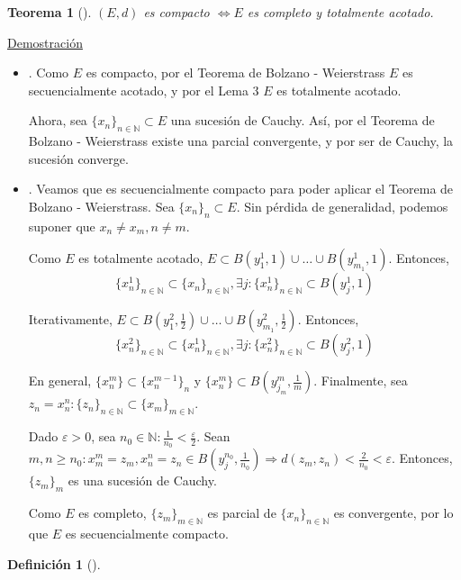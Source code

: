 \documentclass[10pt,a4paper,openright]{book}
\theoremstyle{break}
\newtheorem*{defi}{Definición}
\newtheorem*{theo}{Teorema}
\begin{document}
\begin{theo}[]
$(E,d)$ es compacto $\Leftrightarrow E$ es completo y totalmente acotado.
\end{theo}

\underline{Demostración}

\begin{itemize}
\item \fbox{$\Rightarrow$}.
Como $E$ es compacto, por el Teorema de Bolzano - Weierstrass $E$ es secuencialmente acotado, y por el Lema 3 $E$ es totalmente acotado.

Ahora, sea $\{x_n\}_{n \in \mathbb{N}} \subset E$ una sucesión de Cauchy. Así, por el Teorema de Bolzano - Weierstrass existe una parcial convergente, y por ser de Cauchy, la sucesión converge.
 
\item \fbox{$\Leftarrow$}.
Veamos que es secuencialmente compacto para poder aplicar el Teorema de Bolzano - Weierstrass. Sea $\{x_n\}_n \subset E$. Sin pérdida de generalidad, podemos suponer que $x_n \neq x_m, n \neq m$.

Como $E$ es totalmente acotado, $E \subset B(y_1^1, 1) \cup \ldots \cup B(y_{m_1}^1,1)$. Entonces, 
$$\{x^1_n\}_{n \in \mathbb{N}} \subset \{x_n\}_{n \in \mathbb{N}}, \exists j : \{x_n^1\}_{n \in \mathbb{N}} \subset B(y_j^1, 1)$$

Iterativamente,  $E \subset B(y_1^2, \frac{1}{2}) \cup \ldots \cup B(y_{m_1}^2,\frac{1}{2})$. Entonces, 
$$\{x^2_n\}_{n \in \mathbb{N}} \subset \{x_n^1\}_{n \in \mathbb{N}}, \exists j : \{x_n^2\}_{n \in \mathbb{N}} \subset B(y_j^2, 1)$$

En general, $\{x_n^m\} \subset \{x_n^{m-1}\}_n$ y $\{x_n^m\} \subset B(y_{j_m}^m, \frac{1}{m})$. Finalmente, sea $z_n = x^n_n : \{z_n\}_{n \in \mathbb{N}} \subset \{x_m\}_{m \in \mathbb{N}}$.

Dado $\varepsilon > 0$, sea $n_0 \in \mathbb{N} : \frac{1}{n_0} < \frac{\varepsilon}{2}$. Sean $m,n \geq n_0 : x_m^m = z_m ,  x^n_n = z_n \in B(y_j^{n_0}, \frac{1}{n_0}) \Rightarrow d(z_m, z_n) < \frac{2}{n_0} < \varepsilon$. Entonces, $\{z_m\}_m$ es una sucesión de Cauchy. 

Como $E$ es completo, $\{z_m\}_{m \in \mathbb{N}}$ es parcial de $\{x_n\}_{n \in \mathbb{N}}$ es convergente, por lo que $E$ es secuencialmente compacto. 

\end{itemize}


\begin{defi}[]

\end{defi}
\end{document}
